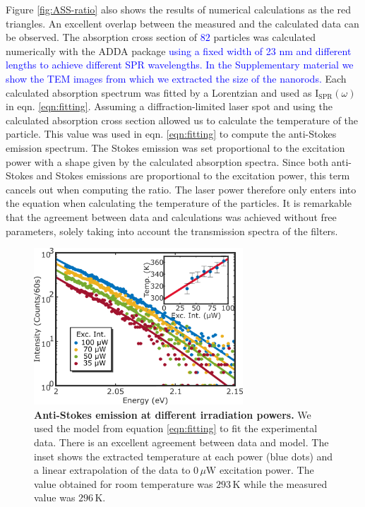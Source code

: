 \documentclass[journal=nalefd,manuscript=letter]{achemso}
\newcommand{\HI}[1]{\textcolor{blue}{#1}} %
\newcommand{\K}{\ensuremath{\,\textrm{K}}}
\newcommand{\uW}{\ensuremath{\,\mu\textrm{W}}}
\begin{document}
Figure \ref{fig:ASS-ratio} also shows the results of numerical calculations as the red
triangles. An excellent overlap between the measured and the calculated data can
be observed. The absorption cross section of \HI{$82$} particles was calculated numerically
with the ADDA package\cite{Yurkin2011} \HI{using a fixed width of 23 nm  and different 
lengths to achieve different SPR wavelengths. In the Supplementary material we 
show the TEM images from which we extracted the size of the nanorods.}
Each calculated absorption spectrum was 
fitted by a Lorentzian and used as $\textrm{I}_{\textrm{SPR}}(\omega)$ in eqn.
\ref{eqn:fitting}. Assuming a diffraction-limited laser spot and using the
calculated absorption cross section allowed us to calculate the temperature of
the particle. This value was used in eqn. \ref{eqn:fitting} to compute the
anti-Stokes emission spectrum. The Stokes emission was set proportional to the
excitation power  with a shape given by the calculated absorption spectra. Since both
anti-Stokes and Stokes emissions are proportional to the excitation power, this
term cancels out when computing the ratio. The laser power therefore only enters
into the equation when calculating the temperature of the particles. It is
remarkable that the agreement between data and calculations was achieved
without free parameters, solely taking into account the transmission spectra of
the filters.

\begin{figure}[tp] \centering
\includegraphics[width=78.4mm]{Figures/03_Fit_Of_AS/03_Log_Fit_AS.png}
\caption{\textbf{Anti-Stokes emission at different irradiation powers.} We used 
the model from equation \ref{eqn:fitting} to fit the experimental data. 
There is an excellent agreement between data and model. The inset shows the extracted
temperature at each power (blue dots) and a linear 
extrapolation of the data to $0\uW$ excitation power.
The value obtained for room temperature was $293\K$ while the measured value was
$296\K$.}
	\label{fig:AS_in_Log}
\end{figure}
\end{document}
